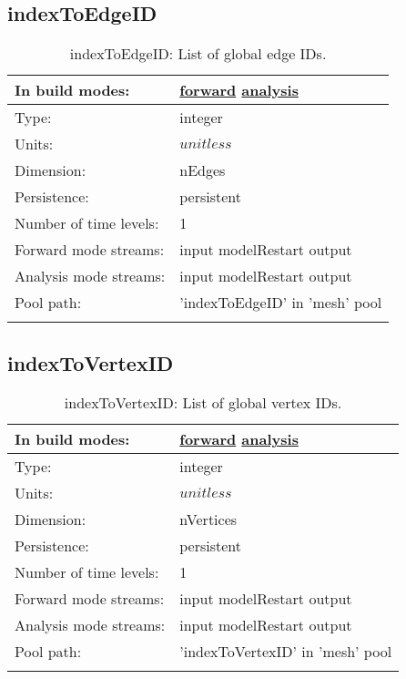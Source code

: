 \subsection[indexToEdgeID]{indexToEdgeID}
\label{subsec:var_sec_mesh_indexToEdgeID}
\begin{center}
\begin{longtable}{| p{2.0in} | p{4.0in} |}
        \hline 
        In build modes: & \hyperref[subsec:forward_var_tab_mesh]{forward} \hyperref[subsec:analysis_var_tab_mesh]{analysis} \\
        \hline 
        Type: & integer \\
        \hline 
        Units: & $unitless$ \\
        \hline 
        Dimension: & nEdges \\
        \hline 
        Persistence: & persistent \\
        \hline 
        Number of time levels: & 1 \\
        \hline 
		 Forward mode streams: &  input modelRestart output \\
        \hline 
		 Analysis mode streams: &  input modelRestart output \\
        \hline 
            Pool path: & 'indexToEdgeID' in 'mesh' pool
 \\
		 \hline 
    \caption{indexToEdgeID: List of global edge IDs.}
\end{longtable}
\end{center}
\subsection[indexToVertexID]{indexToVertexID}
\label{subsec:var_sec_mesh_indexToVertexID}
\begin{center}
\begin{longtable}{| p{2.0in} | p{4.0in} |}
        \hline 
        In build modes: & \hyperref[subsec:forward_var_tab_mesh]{forward} \hyperref[subsec:analysis_var_tab_mesh]{analysis} \\
        \hline 
        Type: & integer \\
        \hline 
        Units: & $unitless$ \\
        \hline 
        Dimension: & nVertices \\
        \hline 
        Persistence: & persistent \\
        \hline 
        Number of time levels: & 1 \\
        \hline 
		 Forward mode streams: &  input modelRestart output \\
        \hline 
		 Analysis mode streams: &  input modelRestart output \\
        \hline 
            Pool path: & 'indexToVertexID' in 'mesh' pool
 \\
		 \hline 
    \caption{indexToVertexID: List of global vertex IDs.}
\end{longtable}
\end{center}
